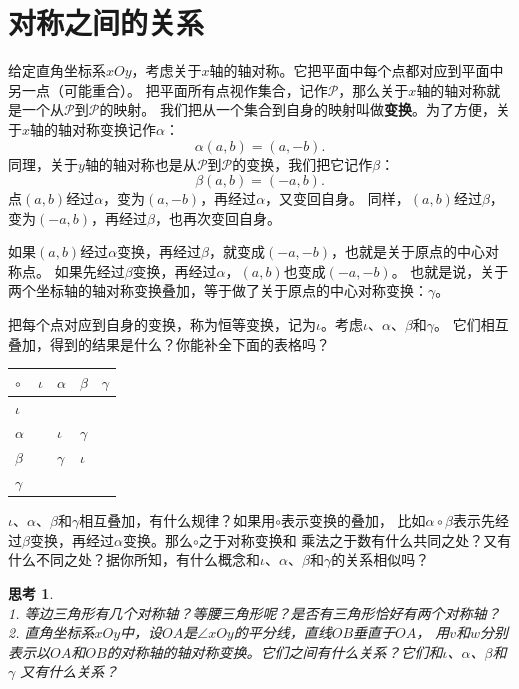 \documentclass[12pt,UTF8]{ctexbook}
\newtheorem{sk}{思考}[section]
\begin{document}
\section{对称之间的关系}
给定直角坐标系$xOy$，考虑关于$x$轴的轴对称。它把平面中每个点都对应到平面中另一点（可能重合）。
把平面所有点视作集合，记作$\mathcal{P}$，那么关于$x$轴的轴对称就是一个从$\mathcal{P}$到$\mathcal{P}$的映射。
我们把从一个集合到自身的映射叫做\textbf{变换}。为了方便，关于$x$轴的轴对称变换记作$\alpha$：
$$ \alpha (a, b) = (a, -b).$$
同理，关于$y$轴的轴对称也是从$\mathcal{P}$到$\mathcal{P}$的变换，我们把它记作$\beta$：
$$ \beta (a, b) = (-a, b).$$
点$(a, b)$经过$\alpha$，变为$(a, -b)$，再经过$\alpha$，又变回自身。
同样，$(a, b)$经过$\beta$，变为$(-a, b)$，再经过$\beta$，也再次变回自身。

如果$(a, b)$经过$\alpha$变换，再经过$\beta$，就变成$(-a, -b)$，也就是关于原点的中心对称点。
如果先经过$\beta$变换，再经过$\alpha$，$(a, b)$也变成$(-a, -b)$。
也就是说，关于两个坐标轴的轴对称变换叠加，等于做了关于原点的中心对称变换：$\gamma$。

把每个点对应到自身的变换，称为恒等变换，记为$\iota$。考虑$\iota$、$\alpha$、$\beta$和$\gamma$。
它们相互叠加，得到的结果是什么？你能补全下面的表格吗？
\begin{center}
    \begin{tabular}{  | p{2em}<{\centering} | p{2em}<{\centering} | p{2em}<{\centering} | p{2em}<{\centering} | p{2em}<{\centering} | }
        \hline
        $\circ$ & $\iota$ & $\alpha$ & $\beta$ & $\gamma$ \\ [0.5ex] 
        \hline
        $\iota$ &  &  &  &  \\  
        \hline
        $\alpha$ &  & $\iota$ & $\gamma$ &  \\  
        \hline
        $\beta$ &  & $\gamma$ & $\iota$ &  \\  
        \hline
        $\gamma$ &  &  &  &  \\ 
        \hline 
    \end{tabular}
\end{center}
$\iota$、$\alpha$、$\beta$和$\gamma$相互叠加，有什么规律？如果用$\circ$表示变换的叠加，
比如$\alpha \circ \beta$表示先经过$\beta$变换，再经过$\alpha$变换。那么$\circ$之于对称变换和
乘法之于数有什么共同之处？又有什么不同之处？据你所知，有什么概念和$\iota$、$\alpha$、$\beta$和$\gamma$的关系相似吗？

\begin{sk}\label{xt:4-2-0}
    \mbox{}\\
    1. 等边三角形有几个对称轴？等腰三角形呢？是否有三角形恰好有两个对称轴？\\
    2. 直角坐标系$xOy$中，设$OA$是$\angle xOy$的平分线，直线$OB$垂直于$OA$，
    用$v$和$w$分别表示以$OA$和$OB$的对称轴的轴对称变换。它们之间有什么关系？它们和$\iota$、$\alpha$、$\beta$和$\gamma$
    又有什么关系？
\end{sk}
\end{document}

